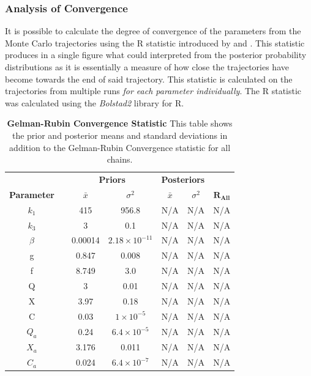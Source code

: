 \subsubsection{Analysis of Convergence}
It is possible to calculate the degree of convergence of the parameters from the Monte Carlo trajectories using the R statistic introduced by \citet{Gelman1992} and \citet{Brooks1998}. This statistic produces in a single figure what could interpreted from the posterior probability distributions as it is essentially a measure of how close the trajectories have become towards the end of said trajectory. This statistic is calculated on the trajectories from multiple runs \textit{for each parameter individually}. The R statistic was calculated using the \textit{Bolstad2}\cite{Curran2011} library for R\cite{RDevelopmentCoreTeam2010}.
\begin{table}[h]%
\renewcommand{\arraystretch}{1.5}
\begin{center}
\begin{tabular}{ccccccc}
\toprule
& & \multicolumn{2}{c}{\textbf{Priors}} & \multicolumn{2}{c}{\textbf{Posteriors}} & \\
\textbf{Parameter} && ${\bar{x}}$ & $\sigma^2$ & ${\bar{x}}$ & $\sigma^2$ & $\mathbf{R_{All}}$\\
\midrule
$k_1$ && 415 & 956.8 & N/A & N/A & N/A\\
$k_3$ && 3 & 0.1 & N/A & N/A & N/A\\
$\beta$ && 0.00014 & $2.18\times 10^{-11}$ & N/A & N/A & N/A\\
g && 0.847 & 0.008 & N/A & N/A & N/A\\
f && 8.749 & 3.0 & N/A & N/A & N/A\\
Q && 3 & 0.01 & N/A & N/A & N/A\\
X && 3.97 & 0.18 & N/A & N/A & N/A\\
C && 0.03 & $1\times 10^{-5}$ & N/A & N/A & N/A\\
$Q_a$ && 0.24 & $6.4\times 10^{-5}$ & N/A & N/A & N/A\\
$X_a$ && 3.176 & 0.011 & N/A & N/A & N/A\\
$C_a$ && 0.024 & $6.4\times 10^{-7}$ & N/A & N/A & N/A\\
\bottomrule
\end{tabular}
\end{center}
\caption[Gelman-Rubin Convergence Statistic]{{\bf Gelman-Rubin Convergence Statistic} This table shows the prior and posterior means and standard deviations in addition to the Gelman-Rubin Convergence statistic for all chains.
\label{tab:oxyRstat}}
\end{table}

